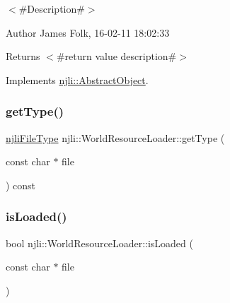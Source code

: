 $<$\#\+Description\#$>$ 

\begin{DoxyAuthor}{Author}
James Folk, 16-\/02-\/11 18\+:02\+:33
\end{DoxyAuthor}
\begin{DoxyReturn}{Returns}
$<$\#return value description\#$>$ 
\end{DoxyReturn}


Implements \mbox{\hyperlink{classnjli_1_1_abstract_object_a08dcf202a47f0782813b8bc98c659e78}{njli\+::\+Abstract\+Object}}.

\mbox{\label{classnjli_1_1_world_resource_loader_a1b95c427bca6bf7cbaf0ae7ee083d744}} 
\subsubsection{\texorpdfstring{get\+Type()}{getType()}\hspace{0.1cm}{\footnotesize\ttfamily [2/2]}}
{\footnotesize\ttfamily \mbox{\hyperlink{namespacenjli_a3699b2e13e71094f00d7f0141e131106}{njli\+File\+Type}} njli\+::\+World\+Resource\+Loader\+::get\+Type (\begin{DoxyParamCaption}\item[{const char $\ast$}]{file }\end{DoxyParamCaption}) const\hspace{0.3cm}{\ttfamily [protected]}}

\mbox{\label{classnjli_1_1_world_resource_loader_a1a1d58baf3b8d4fa094d565a795265f7}} 
\subsubsection{\texorpdfstring{is\+Loaded()}{isLoaded()}}
{\footnotesize\ttfamily bool njli\+::\+World\+Resource\+Loader\+::is\+Loaded (\begin{DoxyParamCaption}\item[{const char $\ast$}]{file }\end{DoxyParamCaption})\hspace{0.3cm}{\ttfamily [protected]}}

